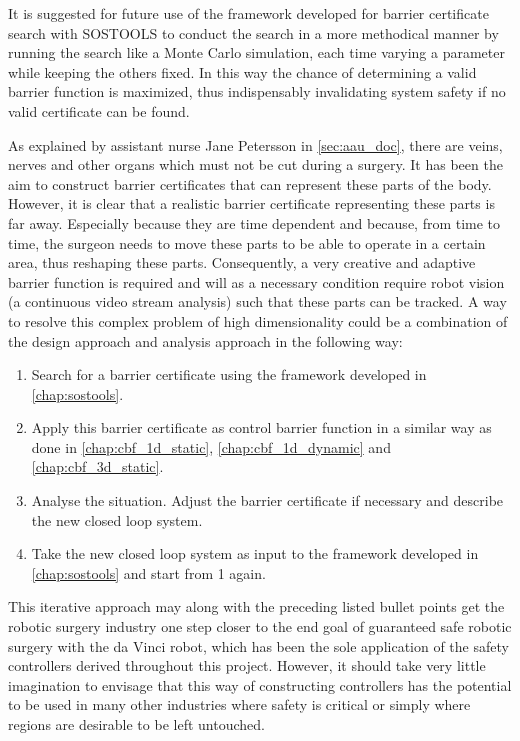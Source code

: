It is suggested for future use of the framework developed for barrier certificate search with SOSTOOLS to conduct the search in a more methodical manner by running the search like a Monte Carlo simulation, each time varying a parameter while keeping the others fixed. In this way the chance of determining a valid barrier function is maximized, thus indispensably invalidating system safety if no valid certificate can be found.

As explained by assistant nurse Jane Petersson in \autoref{sec:aau_doc}, there are veins, nerves and other organs which must not be cut during a surgery. It has been the aim to construct barrier certificates that can represent these parts of the body. However, it is clear that a realistic barrier certificate representing these parts is far away. Especially because they are time dependent and because, from time to time, the surgeon needs to move these parts to be able to operate in a certain area, thus reshaping these parts. Consequently, a very creative and adaptive barrier function is required and will as a necessary condition require robot vision (a continuous video stream analysis) such that these parts can be tracked. A way to resolve this complex problem of high dimensionality could be a combination of the design approach and analysis approach in the following way:
\vspace{-1.5mm}
\begin{enumerate}
	\itemsep-0.5mm
\item Search for a barrier certificate using the framework developed in \autoref{chap:sostools}.
\item Apply this barrier certificate as control barrier function in a similar way as done in \autoref{chap:cbf_1d_static}, \autoref{chap:cbf_1d_dynamic} and \autoref{chap:cbf_3d_static}.
\item Analyse the situation. Adjust the barrier certificate if necessary and describe the new closed loop system.
\item Take the new closed loop system as input to the framework developed in \autoref{chap:sostools} and start from 1 again.
\end{enumerate}
This iterative approach may along with the preceding listed bullet points get the robotic surgery industry one step closer to the end goal of guaranteed safe robotic surgery with the da Vinci robot,
which has been the sole application of the safety controllers derived throughout this project. However, it should take very little imagination to envisage that this way of constructing controllers has the potential to be used in many other industries where safety is critical or simply where regions are desirable to be left untouched.